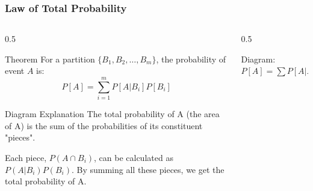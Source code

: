\begin{frame}
    \frametitle{Law of Total Probability}
    
    \begin{columns}[T]
        \begin{column}{0.5\textwidth}
            \begin{block}{Theorem}
                For a partition $\{B_1, B_2, \dots, B_m\}$, the probability of event $A$ is:
                \[ P[A] = \sum_{i=1}^{m} P[A|B_i] P[B_i] \]
            \end{block}
            
            \begin{block}{Diagram Explanation}
                The total probability of A (the area of A) is the sum of the probabilities of its constituent "pieces".
                \vspace{0.5cm}
                
                Each piece, \(P(A \cap B_i)\), can be calculated as \(P(A|B_i)P(B_i)\). By summing all these pieces, we get the total probability of A.
            \end{block}
        \end{column}
        
        \begin{column}{0.5\textwidth}
            \begin{block}{Diagram: \(P[A] = \sum P[A|B_i]P[B_i]\)}
                \centering
\end{block}
\end{column}
\end{columns}
\end{frame}
